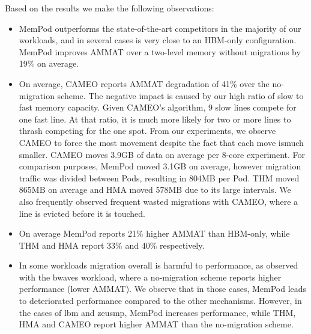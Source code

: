 Based on the results we make the following observations:
\begin{itemize}
\setlength\itemsep{0em}
	\item MemPod outperforms the state-of-the-art competitors in the majority of our workloads, and in several cases is very close to an HBM-only 
configuration. MemPod improves AMMAT over a two-level memory 
without migrations by 19\% on average.
	\item On average, CAMEO reports AMMAT degradation of 41\% over the no-migration scheme. The negative impact is caused by our high ratio of
slow to fast memory capacity.  Given CAMEO's algorithm, 9 slow lines
compete for one fast line.  At that ratio, it is much more likely for
two or more lines to thrash competing for the one spot.
From our experiments, we observe CAMEO to force the most movement despite the
fact that each move ismuch smaller.  CAMEO moves 3.9GB of data on average per 
8-core experiment. For comparison purposes, MemPod moved 3.1GB on average, however migration traffic was divided between Pods, resulting in 804MB per Pod. 
THM moved 865MB on average and HMA moved 578MB due to its large intervals. 
We also frequently observed frequent wasted migrations with CAMEO, where a 
line is 
evicted before it is touched. 
	\item On average MemPod reports 21\% higher AMMAT than HBM-only, while THM and HMA report 33\% and 40\% respectively.
	
	\item In some workloads migration overall is harmful to performance, 
as observed with the bwaves workload, where a no-migration scheme reports 
higher performance (lower AMMAT). We observe that in those cases, MemPod leads to deteriorated performance compared to the other mechanisms. However, in the cases of lbm and zeusmp, 
MemPod increases performance, while THM, HMA and CAMEO report higher AMMAT than the no-migration scheme.


\end{itemize}
